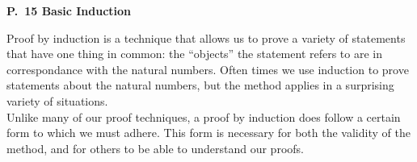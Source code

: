 \documentclass[12 pt]{article}
\theoremstyle{definition}
\theoremstyle{plain}
\theoremstyle{mytheorem}
\theoremstyle{myexample}
\theoremstyle{mydefinition}
\begin{document}
\begin{center}
\textbf{P.~15 Basic Induction}
\end{center}

\noindent Proof by induction is a technique that allows us to prove a variety of statements that have one thing in common: the ``objects'' the statement refers to are in correspondance with the natural numbers.  Often times we use induction to prove statements about the natural numbers, but the method applies in a surprising variety of situations.\\

Unlike many of our proof techniques, a proof by induction does follow a certain form to which we must adhere.  This form is necessary for both the validity of the method, and for others to be able to understand our proofs.

\begin{center}
\end{center}
\end{document}
